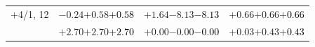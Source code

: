 \documentclass[compress]{beamer}
\begin{document}
\begin{frame}
\begin{tabular}{r | c | c | c}
$+$4/1, 12 & $-0.24$\hspace{0.1 cm}$+0.58$\hspace{0.1 cm}\textcolor{black}{$+0.58$} & $+1.64$\hspace{0.1 cm}$-8.13$\hspace{0.1 cm}\textcolor{black}{$-8.13$} & $+0.66$\hspace{0.1 cm}$+0.66$\hspace{0.1 cm}\textcolor{black}{$+0.66$} \\
           & $+2.70$\hspace{0.1 cm}$+2.70$\hspace{0.1 cm}\textcolor{black}{$+2.70$} & $+0.00$\hspace{0.1 cm}$-0.00$\hspace{0.1 cm}\textcolor{black}{$-0.00$} & $+0.03$\hspace{0.1 cm}$+0.43$\hspace{0.1 cm}\textcolor{black}{$+0.43$} \\
\end{tabular}
\end{frame}
\end{document}
